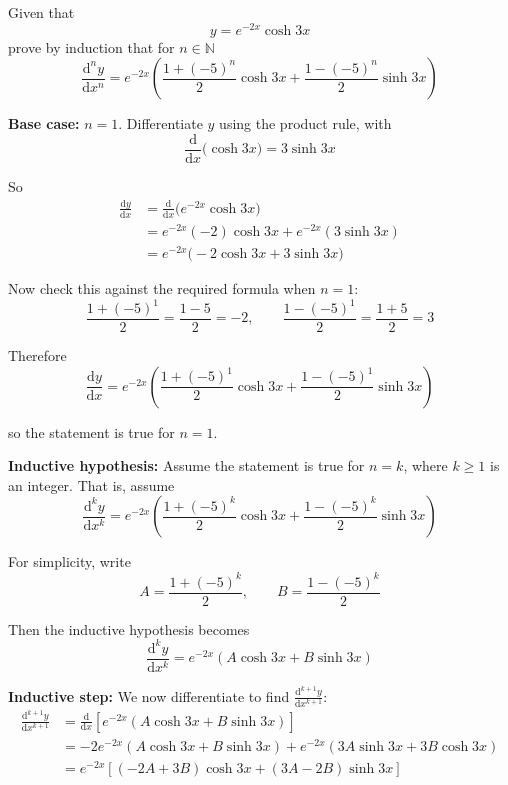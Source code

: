 \documentclass[leqno]{article}
\begin{document}
\begin{enumerate}[
  label=\textbf{\arabic*.},
  leftmargin=*,
  topsep=0pt,
  partopsep=0pt,
  parsep=0pt
]
\newpage

\questionitem

Given that
\[
y=e^{-2x}\cosh 3x
\]
prove by induction that for $n \in \mathbb{N}$
\[
\frac{\mathrm{d}^n y}{\mathrm{d}x^n}=e^{-2x}\left(\frac{1+(-5)^n}{2}\cosh 3x+\frac{1-(-5)^n}{2}\sinh 3x\right)
\] 

\vspace*{10pt}

\begin{djsSolution}
\textbf{Base case:} \(n=1\). Differentiate \(y\) using the product rule, with
\[
\frac{\mathrm{d}}{\mathrm{d}x}\big(\cosh 3x\big)=3\sinh 3x
\]

So
\begin{align*}
\frac{\mathrm{d}y}{\mathrm{d}x}
&=\frac{\mathrm{d}}{\mathrm{d}x}\big(e^{-2x}\cosh 3x\big) \\
&=e^{-2x}(-2)\cosh 3x+e^{-2x}(3\sinh 3x) \\
&=e^{-2x}\big(-2\cosh 3x+3\sinh 3x\big)
\end{align*}

Now check this against the required formula when $n=1$:
\[
\frac{1+(-5)^1}{2}=\frac{1-5}{2}=-2,
\qquad
\frac{1-(-5)^1}{2}=\frac{1+5}{2}=3
\]

Therefore
\[
\frac{\mathrm{d}y}{\mathrm{d}x}
=
e^{-2x}\left(\frac{1+(-5)^1}{2}\cosh 3x+\frac{1-(-5)^1}{2}\sinh 3x\right)
\]

so the statement is true for \(n=1\).

\textbf{Inductive hypothesis:} Assume the statement is true for \(n=k\), where \(k\ge 1\) is an integer. That is, assume
\[
\frac{\mathrm{d}^k y}{\mathrm{d}x^k}
=
e^{-2x}\left(\frac{1+(-5)^k}{2}\cosh 3x+\frac{1-(-5)^k}{2}\sinh 3x\right)
\]

For simplicity, write
\[
A=\frac{1+(-5)^k}{2},
\qquad
B=\frac{1-(-5)^k}{2}
\]

Then the inductive hypothesis becomes
\[
\frac{\mathrm{d}^k y}{\mathrm{d}x^k}=e^{-2x}(A\cosh 3x+B\sinh 3x)
\]

\textbf{Inductive step:} We now differentiate to find \(\frac{\mathrm{d}^{k+1}y}{\mathrm{d}x^{k+1}}\):
\begin{align*}
\frac{\mathrm{d}^{k+1}y}{\mathrm{d}x^{k+1}}
&=\frac{\mathrm{d}}{\mathrm{d}x}\left[e^{-2x}(A\cosh 3x+B\sinh 3x)\right] \\
&=-2e^{-2x}(A\cosh 3x+B\sinh 3x)
+e^{-2x}(3A\sinh 3x+3B\cosh 3x) \\
&=e^{-2x}\left[(-2A+3B)\cosh 3x+(3A-2B)\sinh 3x\right]
\end{align*}


\end{djsSolution}
\end{enumerate}
\end{document}
